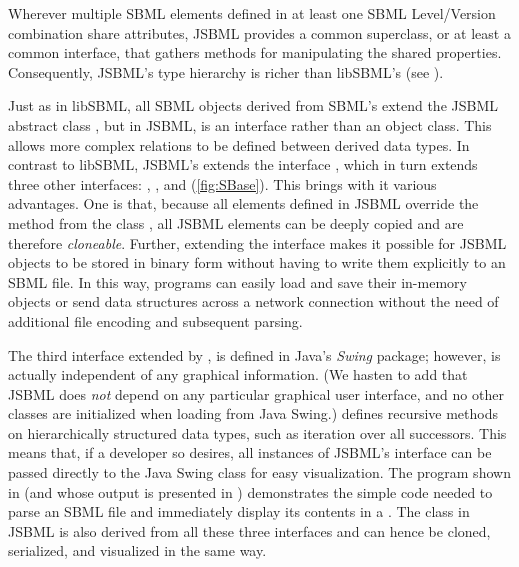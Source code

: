 Wherever multiple SBML elements defined in at least one SBML Level/Version
combination  share attributes, JSBML
 provides a common superclass, or at least a
common interface, that gathers methods for manipulating the shared
properties. Consequently, JSBML's type hierarchy  is richer than libSBML's (see
).

Just as in libSBML,  all
SBML objects derived from SBML's \SBase extend the JSBML abstract class
\SBase, but in JSBML, \SBase is an interface rather than an object class.
This allows more complex relations to be defined between derived data
types. In contrast to libSBML, JSBML's \SBase extends the interface
\TreeNodeWithChangeSupport, which in turn extends three other interfaces:
\Cloneable, \Serializable, and \TreeNode (\vref*{fig:SBase}).
This brings with it various advantages. One is that, because all elements
defined in JSBML  override the  method from
the class ,  all JSBML
elements can be deeply copied and are therefore \emph{cloneable}. Further,
extending the interface \Serializable makes it possible for JSBML
 objects to be stored in
binary form without having to write them explicitly to an SBML file.
 In this way, programs can easily load and save their
in-memory objects or send data structures across a network connection
without the need of additional file encoding and subsequent parsing.

The third interface extended by \SBase, \TreeNode is defined in Java's
\emph{Swing}  package; however,
\TreeNode is actually independent of any graphical information.  (We hasten
to add that JSBML does \emph{not} depend on any particular graphical user
interface, and no other classes are initialized when loading \TreeNode from
Java Swing.)  \TreeNode defines recursive methods on hierarchically
structured data types, such as iteration over all successors. This means
that, if a developer so desires, all instances of JSBML's \SBase interface
can be passed directly to the Java Swing  class \JTree {} for easy visualization. The program shown in
 (and whose output is presented in
) demonstrates the simple code
needed to parse an SBML file  and immediately display
its contents in a \JFrame. 
The \ASTNode class in JSBML is also derived from all these three interfaces
and can hence be cloned, serialized, and visualized in the same way.

